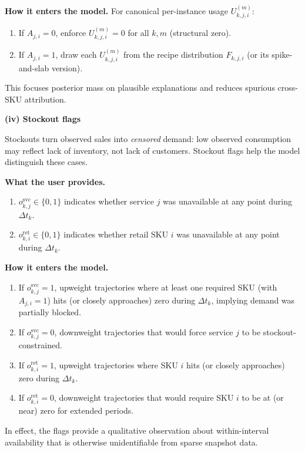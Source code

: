 \documentclass[11pt]{article}
\begin{document}
\textbf{How it enters the model.} For canonical per-instance usage $U^{(m)}_{k,j,i}$:
\begin{enumerate}
  \item If $A_{j,i}=0$, enforce $U^{(m)}_{k,j,i}=0$ for all $k,m$ (structural zero).
  \item If $A_{j,i}=1$, draw each $U^{(m)}_{k,j,i}$ from the recipe distribution $F_{k,j,i}$ (or its spike-and-slab version).
\end{enumerate}

This focuses posterior mass on plausible explanations and reduces spurious cross-SKU attribution.

\textbf{(iv) Stockout flags}

Stockouts turn observed sales into \emph{censored} demand: low observed consumption may reflect lack of inventory, not lack of customers.
Stockout flags help the model distinguish these cases.

\textbf{What the user provides.}
\begin{enumerate}
  \item $o^{\mathrm{svc}}_{k,j}\in\{0,1\}$ indicates whether service $j$ was unavailable at any point during $\Delta t_k$.
  \item $o^{\mathrm{ret}}_{k,i}\in\{0,1\}$ indicates whether retail SKU $i$ was unavailable at any point during $\Delta t_k$.
\end{enumerate}

\textbf{How it enters the model.}
\begin{enumerate}
  \item If $o^{\mathrm{svc}}_{k,j}=1$, upweight trajectories where at least one required SKU (with $A_{j,i}=1$) hits (or closely approaches) zero during $\Delta t_k$, implying demand was partially blocked.
  \item If $o^{\mathrm{svc}}_{k,j}=0$, downweight trajectories that would force service $j$ to be stockout-constrained.

  \item If $o^{\mathrm{ret}}_{k,i}=1$, upweight trajectories where SKU $i$ hits (or closely approaches) zero during $\Delta t_k$.
  \item If $o^{\mathrm{ret}}_{k,i}=0$, downweight trajectories that would require SKU $i$ to be at (or near) zero for extended periods.
\end{enumerate}

In effect, the flags provide a qualitative observation about within-interval availability that is otherwise unidentifiable from sparse snapshot data.
\end{document}
